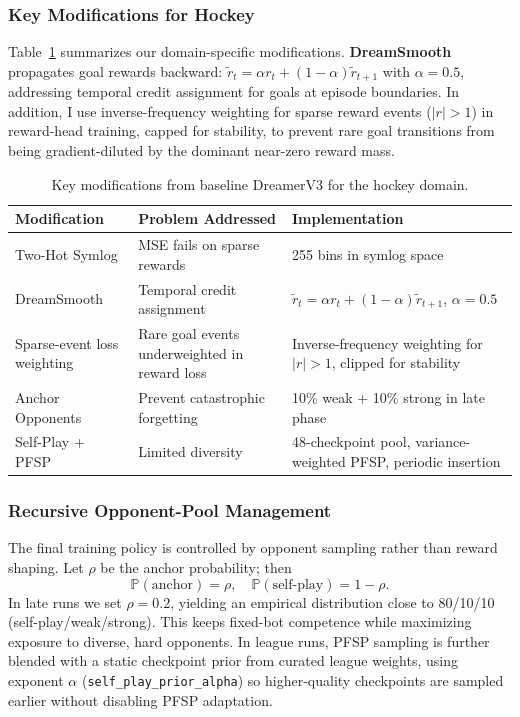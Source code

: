 \documentclass[11pt]{article}
\begin{document}
\subsubsection{Key Modifications for Hockey}

Table~\ref{tab:modifications} summarizes our domain-specific modifications. \textbf{DreamSmooth}~\cite{dreamsmooth2023} propagates goal rewards backward: $\tilde{r}_t = \alpha r_t + (1-\alpha)\tilde{r}_{t+1}$ with $\alpha = 0.5$, addressing temporal credit assignment for goals at episode boundaries. In addition, I use inverse-frequency weighting for sparse reward events ($|r|>1$) in reward-head training, capped for stability, to prevent rare goal transitions from being gradient-diluted by the dominant near-zero reward mass.

\begin{table}[h]
\centering
\small
\begin{tabular}{lp{4.2cm}p{4.8cm}}
\toprule
\textbf{Modification} & \textbf{Problem Addressed} & \textbf{Implementation} \\
\midrule
Two-Hot Symlog & MSE fails on sparse rewards & 255 bins in symlog space \\
DreamSmooth & Temporal credit assignment & $\tilde{r}_t = \alpha r_t + (1-\alpha)\tilde{r}_{t+1}$, $\alpha=0.5$ \\
Sparse-event loss weighting & Rare goal events underweighted in reward loss & Inverse-frequency weighting for $|r|>1$, clipped for stability \\
Anchor Opponents & Prevent catastrophic forgetting & 10\% weak + 10\% strong in late phase \\
Self-Play + PFSP & Limited diversity & 48-checkpoint pool, variance-weighted PFSP, periodic insertion \\
\bottomrule
\end{tabular}
\caption{Key modifications from baseline DreamerV3 for the hockey domain.}
\label{tab:modifications}
\end{table}

\subsubsection{Recursive Opponent-Pool Management}

The final training policy is controlled by opponent sampling rather than reward shaping. Let $\rho$ be the anchor probability; then
\[
\mathbb{P}(\text{anchor})=\rho,\quad \mathbb{P}(\text{self-play})=1-\rho.
\]
In late runs we set $\rho=0.2$, yielding an empirical distribution close to 80/10/10 (self-play/weak/strong). This keeps fixed-bot competence while maximizing exposure to diverse, hard opponents.
In league runs, PFSP sampling is further blended with a static checkpoint prior from curated league weights, using exponent $\alpha$ (\texttt{self\_play\_prior\_alpha}) so higher-quality checkpoints are sampled earlier without disabling PFSP adaptation.
\end{document}
